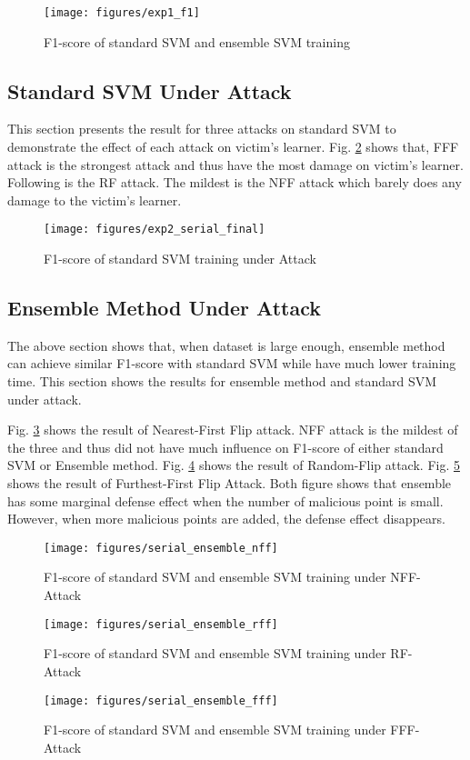 \documentclass[10pt,conference,compsocconf,letterpaper]{IEEEtran}
\begin{document}
\begin{figure}[h]
  \centering
  \label{fig:ensemble_f1}
	  \texttt{[image: figures/exp1\_f1]}
  \caption{F1-score of standard SVM and ensemble SVM training}
\end{figure}

\subsection{Standard SVM Under Attack}
This section presents the result for three attacks on standard SVM to demonstrate the effect of each attack on victim's learner. Fig. \ref{fig:exp2_serial_final} shows that, FFF attack is the strongest attack and thus have the most damage on victim's learner. Following is the RF attack. The mildest is the NFF attack which barely does any damage to the victim's learner.


\begin{figure}[h]
  \centering
  \label{fig:exp2_serial_final}
  \texttt{[image: figures/exp2\_serial\_final]}
  \caption{F1-score of standard SVM training under Attack}
\end{figure}

\subsection{Ensemble Method Under Attack}
The above section shows that, when dataset is large enough, ensemble method can achieve similar F1-score with standard SVM while have much lower training time. This section shows the results for ensemble method and standard SVM under attack. 

Fig. \ref{fig:ensemble_nff} shows the result of Nearest-First Flip attack. NFF attack is the mildest of the three and thus did not have much influence on F1-score of either standard SVM or Ensemble method. Fig. \ref{fig:ensemble_rff} shows the result of Random-Flip attack. Fig. \ref{fig:ensemble_fff} shows the result of Furthest-First Flip Attack. Both figure shows that ensemble has some marginal defense effect when the number of malicious point is small. However, when more malicious points are added, the defense effect disappears.

\begin{figure}[h]
  \centering
  \label{fig:ensemble_nff}
  \texttt{[image: figures/serial\_ensemble\_nff]}
  \caption{F1-score of standard SVM and ensemble SVM training under NFF-Attack}
\end{figure}
\begin{figure}[h]
  \centering
  \label{fig:ensemble_rff}
  \texttt{[image: figures/serial\_ensemble\_rff]}
  \caption{F1-score of standard SVM and ensemble SVM training under RF-Attack}
\end{figure}
\begin{figure}[h]
  \centering
  \label{fig:ensemble_fff}
  \texttt{[image: figures/serial\_ensemble\_fff]}
  \caption{F1-score of standard SVM and ensemble SVM training under FFF-Attack}
\end{figure}
\end{document}
